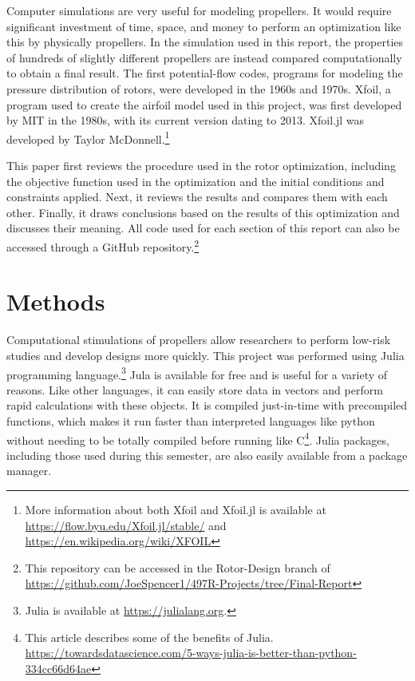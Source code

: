 \documentclass[journal ]{new-aiaa}
\begin{document}
Computer simulations are very useful for modeling propellers. It would require significant investment of time, space, and money to perform an optimization like this by physically propellers. In the simulation used in this report, the properties of hundreds of slightly different propellers are instead compared computationally to obtain a final result. The first potential-flow codes, programs for modeling the pressure distribution of rotors, were developed in the 1960s and 1970s. Xfoil, a program used to create the airfoil model used in this project, was first developed by MIT in the 1980s, with its current version dating to 2013. Xfoil.jl was developed by Taylor McDonnell.\footnote{More information about both Xfoil and Xfoil.jl is available at \url{https://flow.byu.edu/Xfoil.jl/stable/} and \url{https://en.wikipedia.org/wiki/XFOIL}}

This paper first reviews the procedure used in the rotor optimization, including the objective function used in the optimization and the initial conditions and constraints applied. Next, it reviews the results and compares them with each other. Finally, it draws conclusions based on the results of this optimization and discusses their meaning. All code used for each section of this report can also be accessed through a GitHub repository.\footnote{This repository can be accessed in the Rotor-Design branch of \url{https://github.com/JoeSpencer1/497R-Projects/tree/Final-Report}}


\section{Methods}

Computational stimulations of propellers allow researchers to perform low-risk studies and develop designs more quickly. This project was performed using Julia programming language.\footnote{Julia is available at \url{https://julialang.org}.} Jula is available for free and is useful for a variety of reasons. Like other languages, it can easily store data in vectors and perform rapid calculations with these objects. It is compiled just-in-time with precompiled functions, which makes it run faster than interpreted languages like python without needing to be totally compiled before running like C\footnote{This article describes some of the benefits of Julia. \url{https://towardsdatascience.com/5-ways-julia-is-better-than-python-334cc66d64ae}}. Julia  packages, including those used during this semester, are also easily available from a package manager.
\end{document}

